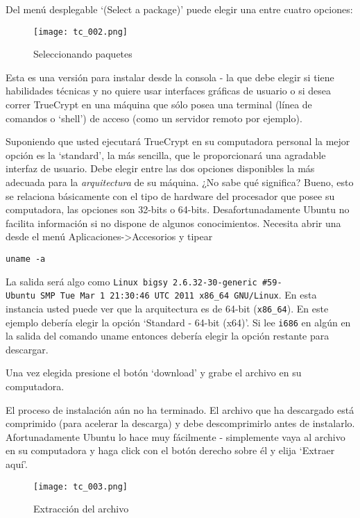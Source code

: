 \documentclass[10pt,a5paper,twoside,,]{book}
\begin{document}
Del menú desplegable `(Select a package)' puede elegir una entre cuatro
opciones:

\begin{figure}[htbp]
\centering
\texttt{[image: tc\_002.png]}
\caption{Seleccionando paquetes}
\end{figure}

Esta es una versión para instalar desde la consola - la que debe elegir
si tiene habilidades técnicas y no quiere usar interfaces gráficas de
usuario o si desea correr TrueCrypt en una máquina que sólo posea una
terminal (línea de comandos o `shell') de acceso (como un servidor
remoto por ejemplo).

Suponiendo que usted ejecutará TrueCrypt en su computadora personal la
mejor opción es la `standard', la más sencilla, que le proporcionará una
agradable interfaz de usuario. Debe elegir entre las dos opciones
disponibles la más adecuada para la \emph{arquitectura} de su máquina.
¿No sabe qué significa? Bueno, esto se relaciona básicamente con el tipo
de hardware del procesador que posee su computadora, las opciones son
32-bits o 64-bits. Desafortunadamente Ubuntu no facilita información si
no dispone de algunos conocimientos. Necesita abrir una desde el menú
Aplicaciones-\textgreater{}Accesorios y tipear

\begin{verbatim}
uname -a
\end{verbatim}

La salida será algo como
\texttt{Linux\ bigsy\ 2.6.32-30-generic\ \#59-Ubuntu\ SMP\ Tue\ Mar\ 1\ 21:30:46\ UTC\ 2011\ x86\_64\ GNU/Linux}.
En esta instancia usted puede ver que la arquitectura es de 64-bit
(\texttt{x86\_64}). En este ejemplo debería elegir la opción `Standard -
64-bit (x64)'. Si lee \texttt{i686} en algún en la salida del comando
uname entonces debería elegir la opción restante para descargar.

Una vez elegida presione el botón `download' y grabe el archivo en su
computadora.

El proceso de instalación aún no ha terminado. El archivo que ha
descargado está comprimido (para acelerar la descarga) y debe
descomprimirlo antes de instalarlo. Afortunadamente Ubuntu lo hace muy
fácilmente - simplemente vaya al archivo en su computadora y haga click
con el botón derecho sobre él y elija `Extraer aquí'.

\begin{figure}[htbp]
\centering
\texttt{[image: tc\_003.png]}
\caption{Extracción del archivo}
\end{figure}
\end{document}
